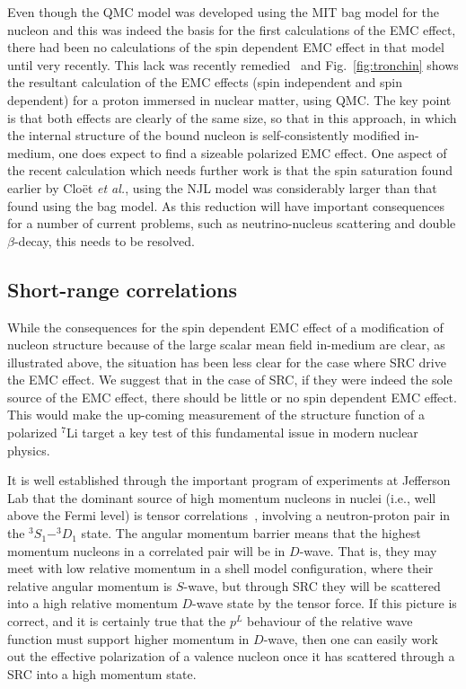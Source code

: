 \documentclass{ws-ijmpe}
\begin{document}
Even though the QMC model was developed using the MIT bag model for the nucleon and this was indeed the basis for the first calculations of the EMC effect, there had been no calculations of the spin dependent EMC effect in that model until very recently. This lack was recently remedied~\cite{Tronchin:2018mvu} and Fig.~\ref{fig:tronchin} shows the resultant calculation of the EMC effects (spin independent and spin dependent) for a proton immersed in nuclear matter, using QMC. The key point is that both effects are clearly of the same size, so that in this approach, in which the internal structure of the bound nucleon is self-consistently modified in-medium, one does expect to find a sizeable polarized EMC effect. One aspect of the recent calculation which needs further work is that the spin saturation found earlier by Clo\"et {\it et al.}, using the NJL model was considerably larger than that found using the bag model. As this reduction will have important consequences for a number of current problems, such as neutrino-nucleus scattering and double $\beta$-decay, this needs to be resolved.

\subsection{Short-range correlations}
While the consequences for the spin dependent EMC effect of a modification of nucleon structure because of the large scalar mean field in-medium are clear, as illustrated above, the situation has been less clear for the case where SRC drive the EMC effect. We suggest that in the case of SRC, if they were indeed the sole source of the EMC effect, there should be little or no spin dependent EMC effect. This would make the up-coming measurement of the structure function of a polarized $^7$Li target a key test of this fundamental issue in modern nuclear physics.

It is well established through the important program of experiments at Jefferson Lab that the dominant source of high momentum nucleons in nuclei (i.e., well above the Fermi level) is 
tensor correlations~\cite{Subedi:2008zz,Arrington:2011xs}, involving a neutron-proton pair in the $^3S_1 - ^3D_1$ state. The angular momentum barrier means that the highest momentum nucleons in a correlated pair will be in $D$-wave. That is, they may meet with low relative momentum in a shell model configuration, where their relative  angular momentum is $S$-wave, but through SRC they will be scattered into a high relative momentum $D$-wave state by the tensor force. If this picture is correct, and it is certainly true that the $p^L$ behaviour of the relative wave function must support higher momentum in $D$-wave, then one can easily work out the effective polarization of a valence nucleon once it has scattered through a SRC into a high momentum state. 
\end{document}
